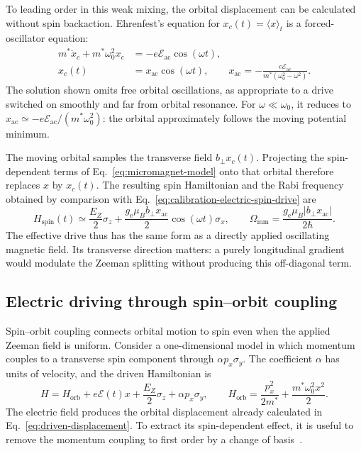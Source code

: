 To leading order in this weak mixing, the orbital displacement
can be calculated without spin backaction. Ehrenfest's equation
for $x_c(t)=\langle x\rangle_t$ is a forced-oscillator equation:
\begin{equation}
 \begin{aligned}
 m^*\ddot x_c+m^*\omega_0^2x_c
    &=-e\mathcal E_{\mathrm{ac}}\cos(\omega t),\\
 x_c(t)&=x_{\mathrm{ac}}\cos(\omega t),\qquad
 x_{\mathrm{ac}}=-\frac{e\mathcal E_{\mathrm{ac}}}
                         {m^*(\omega_0^2-\omega^2)}.
 \end{aligned}
 \label{eq:driven-displacement}
\end{equation}
The solution shown omits free orbital oscillations, as appropriate
to a drive switched on smoothly and far from orbital resonance.
For $\omega\ll\omega_0$, it reduces to
$x_{\mathrm{ac}}\simeq-e\mathcal E_{\mathrm{ac}}/(m^*\omega_0^2)$:
the orbital approximately follows the moving potential minimum.

The moving orbital samples the transverse field $b_\perp x_c(t)$.
Projecting the spin-dependent terms of
Eq.~\eqref{eq:micromagnet-model} onto that orbital therefore
replaces $x$ by $x_c(t)$. The resulting spin Hamiltonian and the
Rabi frequency obtained by comparison with
Eq.~\eqref{eq:calibration-electric-spin-drive} are
\begin{equation}
 H_{\mathrm{spin}}(t)\simeq\frac{E_Z}{2}\sigma_z
  +\frac{g_{\mathrm e}\mu_B b_\perp x_{\mathrm{ac}}}{2}
        \cos(\omega t)\sigma_x,\qquad
 \Omega_{\mathrm{mm}}
   =\frac{g_{\mathrm e}\mu_B|b_\perp x_{\mathrm{ac}}|}{2\hbar}.
 \label{eq:micromagnet-rabi}
\end{equation}
The effective drive thus has the same form as a directly applied
oscillating magnetic field. Its transverse direction matters:
a purely longitudinal gradient would modulate the Zeeman
splitting without producing this off-diagonal term.

\subsection{Electric driving through spin--orbit coupling}
\label{sec:drive-spin-orbit}

Spin--orbit coupling connects orbital motion to spin even when
the applied Zeeman field is uniform. Consider a one-dimensional
model in which momentum couples to a transverse spin component
through $\alpha p_x\sigma_y$. The coefficient $\alpha$ has units
of velocity, and the driven Hamiltonian is
\begin{equation}
 H=H_{\mathrm{orb}}+e\mathcal E(t)x
      +\frac{E_Z}{2}\sigma_z+\alpha p_x\sigma_y,\qquad
 H_{\mathrm{orb}}=\frac{p_x^2}{2m^*}+\frac{m^*\omega_0^2x^2}{2}.
 \label{eq:so-model}
\end{equation}
The electric field produces the orbital displacement already
calculated in Eq.~\eqref{eq:driven-displacement}. To extract its
spin-dependent effect, it is useful to remove the momentum
coupling to first order by a change of basis~\cite{Golovach2006}.

